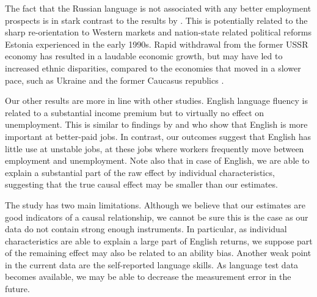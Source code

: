 \documentclass[12pt, a4paper]{article}
\begin{document}
The fact that the Russian language is not associated with any better
employment prospects
is in stark contrast to the results by \citet{Alan2015}. This is
potentially related to the sharp re-orientation to Western markets and
nation-state related political reforms Estonia experienced in the
early 1990s. Rapid withdrawal from the former USSR economy has
resulted in
a laudable economic growth, but may have led to
increased ethnic disparities, compared to the economies that moved in
a slower pace, such as Ukraine \citep{Constant2011} and the former Caucasus republics
\citep{Alan2015}. 

Our other results are more in line with other studies.
English language fluency is related to a substantial income premium but
to virtually no effect on unemployment. This is similar to findings by
\citet{ginsburgh+prieto-rodriguez2011ILRR} and \cite{fabo+2017E}
who show that English is more important at better-paid
jobs. In contrast, our outcomes suggest that English has little use
at unstable jobs, at these jobs where workers frequently move between
employment and unemployment.
Note also that in case of
English, we are able to explain a substantial part of the raw effect
by individual characteristics, suggesting that the true causal effect
may be smaller than our estimates.

The study has two main limitations. Although we believe that our
estimates are good indicators of a causal relationship, we cannot be
sure this is the case as our data do not contain strong enough instruments.
In particular, as individual characteristics are able to explain a
large part of English returns, we suppose part of the remaining effect
may also be related to an ability bias. Another weak point in the current
data are the self-reported language
skills. As language test data becomes available, we may be able to
decrease the measurement error in the future.




\clearpage
\appendix

\end{document}
